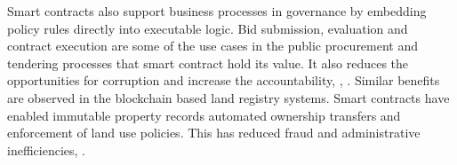 
Smart contracts also support business processes in governance by embedding policy rules directly into executable logic. Bid submission, evaluation and contract execution are some of the use cases in the public procurement and tendering processes that smart contract hold its value. It also reduces the opportunities for corruption and increase the accountability\cite{IEEE_2021_SmartCon}, \cite{GovernanceNow_2023_SmartContractsToolkit}, \cite{AICERTs_2023_FutureOfGovernance}. Similar benefits are observed in the blockchain based land registry systems. Smart contracts have enabled immutable property records automated ownership transfers and enforcement of land use policies. This has reduced fraud and administrative inefficiencies\cite{ResearchGate_2020_LandRegistry}, \cite{MDPI_2023_NamibianLandRegistration}.


